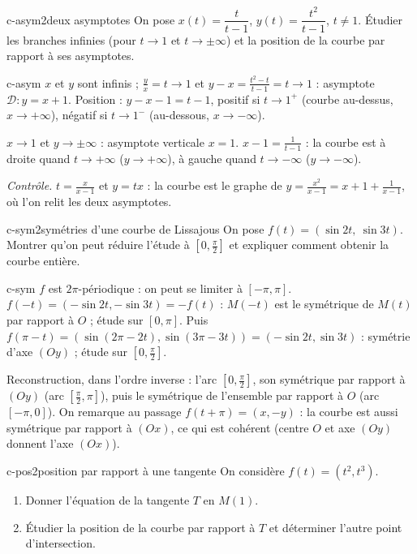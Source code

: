\begin{exo}{c-asym}{2}{deux asymptotes}
On pose $x(t)=\dfrac t{t-1}$, $y(t)=\dfrac{t^2}{t-1}$, $t\neq1$. Étudier les branches infinies (pour $t\to1$ et $t\to\pm\infty$) et la position de la courbe par rapport à ses asymptotes.
\end{exo}

\begin{corrige}{c-asym}
 $x$ et $y$ sont infinis ; $\frac yx=t\to1$ et $y-x=\frac{t^2-t}{t-1}=t\to1$ : asymptote $\mathcal D:y=x+1$. Position : $y-x-1=t-1$, positif si $t\to1^+$ (courbe au-dessus, $x\to+\infty$), négatif si $t\to1^-$ (au-dessous, $x\to-\infty$).

 $x\to1$ et $y\to\pm\infty$ : asymptote verticale $x=1$. $x-1=\frac1{t-1}$ : la courbe est à droite quand $t\to+\infty$ ($y\to+\infty$), à gauche quand $t\to-\infty$ ($y\to-\infty$).

\emph{Contrôle.} $t=\frac x{x-1}$ et $y=tx$ : la courbe est le graphe de $y=\frac{x^2}{x-1}=x+1+\frac1{x-1}$, où l'on relit les deux asymptotes.
\end{corrige}

\begin{exo}{c-sym}{2}{symétries d'une courbe de Lissajous}
On pose $f(t)=(\sin2t,\ \sin3t)$. Montrer qu'on peut réduire l'étude à $\left[0,\frac\pi2\right]$ et expliquer comment obtenir la courbe entière.
\end{exo}

\begin{corrige}{c-sym}
$f$ est $2\pi$-périodique : on peut se limiter à $[-\pi,\pi]$. $f(-t)=(-\sin2t,-\sin3t)=-f(t)$ : $M(-t)$ est le symétrique de $M(t)$ par rapport à $O$ ; étude sur $[0,\pi]$. Puis $f(\pi-t)=(\sin(2\pi-2t),\sin(3\pi-3t))=(-\sin2t,\sin3t)$ : symétrie d'axe $(Oy)$ ; étude sur $\left[0,\frac\pi2\right]$.

Reconstruction, dans l'ordre inverse : l'arc $\left[0,\frac\pi2\right]$, son symétrique par rapport à $(Oy)$ (arc $\left[\frac\pi2,\pi\right]$), puis le symétrique de l'ensemble par rapport à $O$ (arc $[-\pi,0]$). On remarque au passage $f(t+\pi)=(x,-y)$ : la courbe est aussi symétrique par rapport à $(Ox)$, ce qui est cohérent (centre $O$ et axe $(Oy)$ donnent l'axe $(Ox)$).
\end{corrige}

\begin{exo}{c-pos}{2}{position par rapport à une tangente}
On considère $f(t)=(t^2,t^3)$.
\begin{enumerate}
\item Donner l'équation de la tangente $T$ en $M(1)$.
\item Étudier la position de la courbe par rapport à $T$ et déterminer l'autre point d'intersection.
\end{enumerate}
\end{exo}


